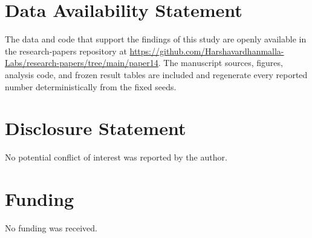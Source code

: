 \documentclass[journal]{IEEEtran}
\begin{document}
\section*{Data Availability Statement}
The data and code that support the findings of this study are openly available in the research-papers repository at \url{https://github.com/Harshavardhanmalla-Labs/research-papers/tree/main/paper14}. The manuscript sources, figures, analysis code, and frozen result tables are included and regenerate every reported number deterministically from the fixed seeds.

\section*{Disclosure Statement}
No potential conflict of interest was reported by the author.

\section*{Funding}
No funding was received.
\end{document}
